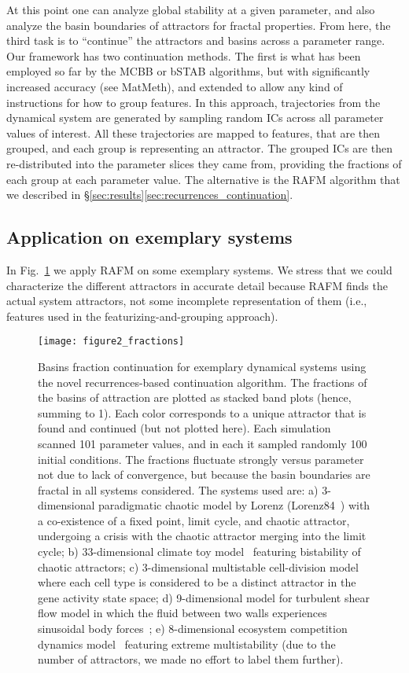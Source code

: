 \documentclass[9pt,twocolumn,twoside,lineno]{pnas-new}
\begin{document}
At this point one can analyze global stability at a given parameter, and also analyze the basin boundaries of attractors for fractal properties. From here, the third task is to ``continue'' the attractors and basins across a parameter range. Our framework has two continuation methods. The first is what has been employed so far by the MCBB or bSTAB algorithms, but with significantly increased accuracy (see MatMeth), and extended to allow any kind of instructions for how to group features. In this approach, trajectories from the dynamical system are generated by sampling random ICs across all parameter values of interest. All these trajectories are mapped to features, that are then grouped, and each group is representing an attractor. The grouped ICs are then re-distributed into the parameter slices they came from, providing the fractions of each group at each parameter value. The alternative is the RAFM algorithm that we described in \S\ref{sec:results}\ref{sec:recurrences_continuation}.

\subsection{Application on exemplary systems}
\label{sec:applications}
In Fig.~\ref{fig:exemplary_fractions} we apply RAFM on some exemplary systems. We stress that we could characterize the different attractors in accurate detail because RAFM finds the actual system attractors, not some incomplete representation of them (i.e., features used in the featurizing-and-grouping approach).

\begin{figure}[!t]
    \centering
    \texttt{[image: figure2\_fractions]}
    \caption{Basins fraction continuation for exemplary dynamical systems using the novel recurrences-based continuation algorithm. The fractions of the basins of attraction are plotted as stacked band plots (hence, summing to 1). Each color corresponds to a unique attractor that is found and continued (but not plotted here). Each simulation scanned 101 parameter values, and in each it sampled randomly 100 initial conditions. The fractions fluctuate strongly versus parameter not due to lack of convergence, but because the basin boundaries are fractal in all systems considered.
    The systems used are: 
    a) 3-dimensional paradigmatic chaotic model by Lorenz (Lorenz84~\cite{Lorenz84}) with a co-existence of a fixed point, limit cycle, and chaotic attractor, undergoing a crisis with the chaotic attractor merging into the limit cycle; 
    b) 33-dimensional climate toy model~\cite{Gelbrecht2021} featuring bistability of chaotic attractors;
    c) 3-dimensional multistable cell-division model~\cite{huang2006multistability} where each cell type is considered to be a distinct attractor in the gene activity state space;
    d) 9-dimensional model for turbulent shear flow model in which the fluid between two walls experiences sinusoidal body forces~\cite{moehlis2004low};
    e) 8-dimensional ecosystem competition dynamics model~\cite{huisman2001fundamental} featuring extreme multistability (due to the number of attractors, we made no effort to label them further).
    }
    \label{fig:exemplary_fractions}
\end{figure}
\end{document}

